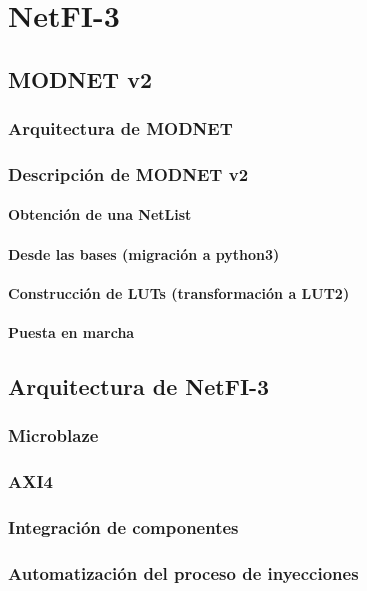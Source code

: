 \chapter{NetFI-3}


\section{MODNET v2}

	\subsection{Arquitectura de MODNET}
	
	\subsection{Descripción de MODNET v2}
	
		\subsubsection{Obtención de una NetList}
		
		\subsubsection{Desde las bases (migración a python3)}
		
		\subsubsection{Construcción de LUTs (transformación a LUT2)}
		
		\subsubsection{Puesta en marcha}
		

\section{Arquitectura de NetFI-3}

	\subsection{Microblaze}
	
	\subsection{AXI4}
	
	\subsection{Integración de componentes}
	
	\subsection{Automatización del proceso de inyecciones}
	